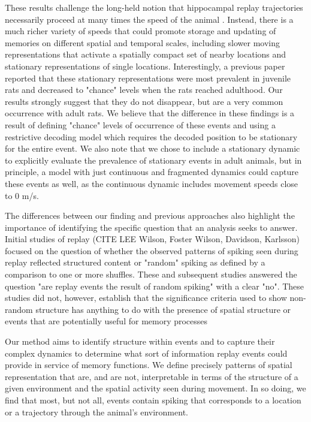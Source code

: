 \documentclass[9pt,lineno]{elife}
\begin{document}
These results challenge the long-held notion that hippocampal replay trajectories necessarily proceed at many times the speed of the animal \citep{NadasdyReplayTimeCompression1999, LeeMemorySequentialExperience2002, DavidsonHippocampalReplayExtended2009}. Instead, there is a much richer variety of speeds that could promote storage and updating of memories on different spatial and temporal scales, including slower moving representations that activate a spatially compact set of nearby locations and stationary representations of single locations. Interestingly, a previous paper \citep{FarooqEmergencepreconfiguredplastic2019} reported that these stationary representations were most prevalent in juvenile rats and decreased to "chance" levels when the rats reached adulthood. Our results strongly suggest that they do not disappear, but are a very common occurrence with adult rats. We believe that the difference in these findings is a result of defining "chance" levels of occurrence of these events and using a restrictive decoding model which requires the decoded position to be stationary for the entire event. We also note that we chose to include a stationary dynamic to explicitly evaluate the prevalence of stationary events in adult animals, but in principle, a model with just continuous and fragmented dynamics could capture these events as well, as the continuous dynamic includes movement speeds close to 0 m/s.

The differences between our finding and previous approaches also highlight the importance of identifying the specific question that an analysis seeks to answer. Initial studies of replay (CITE LEE Wilson, Foster Wilson, Davidson, Karlsson) focused on the question of whether the observed patterns of spiking seen during replay reflected structured content or "random" spiking as defined by a comparison to one or more shuffles. These and subsequent studies answered the question "are replay events the result of random spiking" with a clear "no". These studies did not, however, establish that the significance criteria used to show non-random structure has anything to do with the presence of spatial structure or events that are potentially useful for memory processes

Our method aims to identify structure within events and to capture their complex dynamics to determine what sort of information replay events could provide in service of memory functions. We define precisely patterns of spatial representation that are, and are not, interpretable in terms of the structure of a given environment and the spatial activity seen during movement. In so doing, we find that most, but not all, events contain spiking that corresponds to a location or a trajectory through the animal's environment. 
\end{document}
